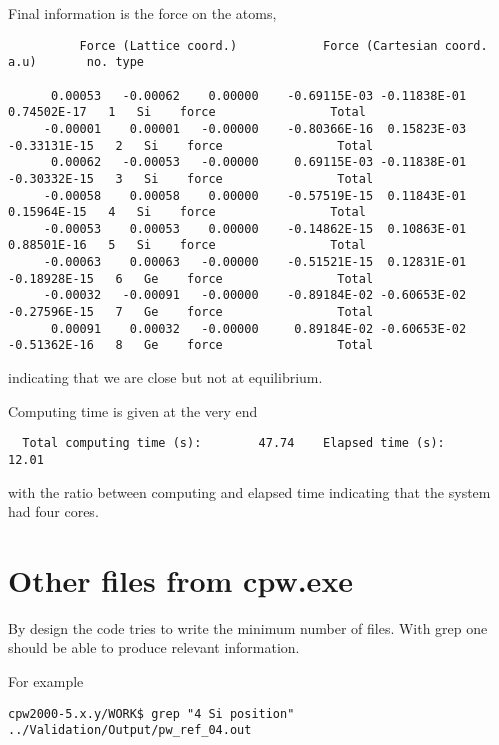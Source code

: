 \documentclass[11pt]{article}
\begin{document}
Final information is the force on the atoms,
\begin{verbatim}
          Force (Lattice coord.)            Force (Cartesian coord. a.u)       no. type

      0.00053   -0.00062    0.00000    -0.69115E-03 -0.11838E-01  0.74502E-17   1   Si    force                Total
     -0.00001    0.00001   -0.00000    -0.80366E-16  0.15823E-03 -0.33131E-15   2   Si    force                Total
      0.00062   -0.00053   -0.00000     0.69115E-03 -0.11838E-01 -0.30332E-15   3   Si    force                Total
     -0.00058    0.00058    0.00000    -0.57519E-15  0.11843E-01  0.15964E-15   4   Si    force                Total
     -0.00053    0.00053    0.00000    -0.14862E-15  0.10863E-01  0.88501E-16   5   Si    force                Total
     -0.00063    0.00063   -0.00000    -0.51521E-15  0.12831E-01 -0.18928E-15   6   Ge    force                Total
     -0.00032   -0.00091   -0.00000    -0.89184E-02 -0.60653E-02 -0.27596E-15   7   Ge    force                Total
      0.00091    0.00032   -0.00000     0.89184E-02 -0.60653E-02 -0.51362E-16   8   Ge    force                Total
\end{verbatim}
indicating that we are close but not at equilibrium.

Computing time is given at the very end
\begin{verbatim}
  Total computing time (s):        47.74    Elapsed time (s):        12.01
\end{verbatim}
with the ratio between computing and elapsed time indicating that the system had four cores.


\section{Other files from cpw.exe}

By design the code tries to write the minimum number of files.  With grep one should be able to
produce relevant information.

For example

\noindent\texttt{cpw2000-5.x.y/WORK\$ grep "4   Si    position" ../Validation/Output/pw\_ref\_04.out}
\end{document}
